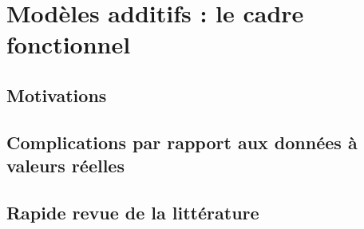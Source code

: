 \chapter{Modèles additifs : le cadre fonctionnel}
{   
    \minitoc%
    
    \section{Motivations}
    
    \section{Complications par rapport aux données à valeurs réelles}
    
    \section{Rapide revue de la littérature}
    
}